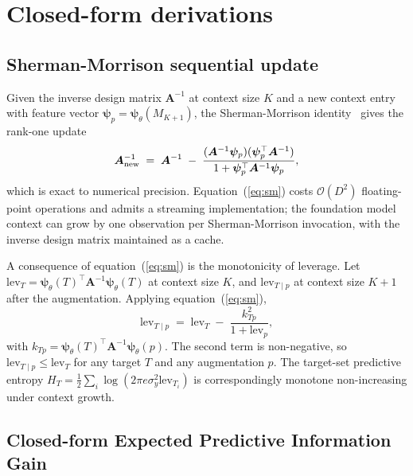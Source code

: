 \documentclass[11pt,a4paper]{article}
\newcommand{\Ainv}{\bm{A}^{-1}}
\newcommand{\psib}{\bm{\psi}}
\begin{document}
\appendix

\section{Closed-form derivations}
\label{app:derivations}

\subsection{Sherman-Morrison sequential update}

Given the inverse design matrix $\Ainv$ at context size $K$ and a new context entry with feature vector $\psib_p = \psib_\theta(M_{K+1})$, the Sherman-Morrison identity~\cite{Sherman:1950} gives the rank-one update
\begin{equation}
  \bm{A}_{\rm new}^{-1} \;=\; \Ainv \;-\; \frac{(\Ainv \psib_p)(\psib_p^\top \Ainv)}{1 + \psib_p^\top \Ainv \psib_p},
  \label{eq:sm}
\end{equation}
which is exact to numerical precision. Equation~(\ref{eq:sm}) costs $\mathcal{O}(D^2)$ floating-point operations and admits a streaming implementation; the foundation model context can grow by one observation per Sherman-Morrison invocation, with the inverse design matrix maintained as a cache.

A consequence of equation~(\ref{eq:sm}) is the monotonicity of leverage. Let $\mathrm{lev}_T = \psib_\theta(T)^\top \Ainv \psib_\theta(T)$ at context size $K$, and $\mathrm{lev}_{T \mid p}$ at context size $K+1$ after the augmentation. Applying equation~(\ref{eq:sm}),
\begin{equation}
  \mathrm{lev}_{T \mid p} \;=\; \mathrm{lev}_T \;-\; \frac{k_{Tp}^2}{1 + \mathrm{lev}_p},
\end{equation}
with $k_{Tp} = \psib_\theta(T)^\top \Ainv \psib_\theta(p)$. The second term is non-negative, so $\mathrm{lev}_{T \mid p} \leq \mathrm{lev}_T$ for any target $T$ and any augmentation $p$. The target-set predictive entropy $H_T = \tfrac{1}{2}\sum_i \log(2\pi e \sigma_y^2 \mathrm{lev}_{T_i})$ is correspondingly monotone non-increasing under context growth.

\subsection{Closed-form Expected Predictive Information Gain}
\end{document}
